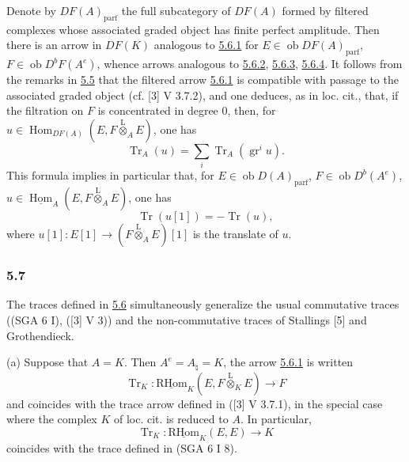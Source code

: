 \documentclass[11pt]{article}
\providecommand{\uHom}{\underline{\Hom}}
\providecommand{\uRHom}{\underline{\RHom}}
\DeclareMathOperator{\Hom}{Hom}
\newcommand{\ob}{\operatorname{ob}}
\providecommand{\RHom}{\mathrm{RHom}}
\providecommand{\Tr}{\operatorname{Tr}}
\providecommand{\Tr}{\operatorname{Tr}}
\providecommand{\lten}{\overset{\mathrm L}{\otimes}}
\providecommand{\Tr}{\operatorname{Tr}}
\providecommand{\RHom}{\mathrm{RHom}}
\providecommand{\Hom}{\operatorname{Hom}}
\providecommand{\ob}{\operatorname{ob}}
\providecommand{\lten}{\overset{\mathrm L}{\otimes}}
\providecommand{\RHom}{\mathrm R\mathcal{H}om}
\providecommand{\lten}{\overset{\mathrm L}{\otimes}}
\providecommand{\Tr}{\operatorname{Tr}}
\providecommand{\lten}{\overset{\mathrm L}{\otimes}}
\providecommand{\lten}{\overset{\mathrm L}{\otimes}}
\providecommand{\lten}{\overset{\mathrm L}{\otimes}}
\providecommand{\RHom}{\mathrm{RHom}}
\providecommand{\Hom}{\operatorname{Hom}}
\providecommand{\Tr}{\operatorname{Tr}}
\providecommand{\lten}{\overset{\mathrm L}{\otimes}}
\begin{document}
Denote by $DF(A)_{\mathrm{parf}}$ the full subcategory of $DF(A)$ formed by filtered complexes whose associated graded object has finite perfect amplitude. Then there is an arrow in $DF(K)$ analogous to \hyperref[sga5:IIIB:equation:5.6.1]{5.6.1} for $E\in\ob DF(A)_{\mathrm{parf}}$, $F\in\ob D^bF(A^e)$, whence arrows analogous to \hyperref[sga5:IIIB:equation:5.6.2]{5.6.2}, \hyperref[sga5:IIIB:equation:5.6.3]{5.6.3}, \hyperref[sga5:IIIB:equation:5.6.4]{5.6.4}. It follows from the remarks in \hyperref[sga5:IIIB:subsubsection:5.5]{5.5} that the filtered arrow \hyperref[sga5:IIIB:equation:5.6.1]{5.6.1} is compatible with passage to the associated graded object (cf. [3] V 3.7.2), and one deduces, as in loc. cit., that, if the filtration on $F$ is concentrated in degree $0$, then, for $u\in\Hom_{DF(A)}(E,F\lten_AE)$, one has
\begin{equation}\tag{5.6.5}\label{sga5:IIIB:equation:5.6.5}
\Tr_A(u)=\sum_i\Tr_A(\operatorname{gr}^i u).
\end{equation}
This formula implies in particular that, for $E\in\ob D(A)_{\mathrm{parf}}$, $F\in\ob D^b(A^e)$, $u\in\uHom_A(E,F\lten_AE)$, one has
\begin{equation}\tag{5.6.6}\label{sga5:IIIB:equation:5.6.6}
\Tr(u[1])=-\Tr(u),
\end{equation}
where $u[1]:E[1]\to(F\lten_AE)[1]$ is the translate of $u$.

\subsubsection*{5.7}\label{sga5:IIIB:subsubsection:5.7}

The traces defined in \hyperref[sga5:IIIB:subsubsection:5.6]{5.6} simultaneously generalize the usual commutative traces ((SGA 6 I), ([3] V 3)) and the non-commutative traces of Stallings [5] and Grothendieck.

(a) Suppose that $A=K$. Then $A^e=A_\natural=K$, the arrow \hyperref[sga5:IIIB:equation:5.6.1]{5.6.1} is written
\[
\Tr_K:\uRHom_K(E,F\lten_KE)\longrightarrow F
\]
and coincides with the trace arrow defined in ([3] V 3.7.1), in the special case where the complex $K$ of loc. cit. is reduced to $A$. In particular,
\[
\Tr_K:\uRHom_K(E,E)\longrightarrow K
\]
coincides with the trace defined in (SGA 6 I 8).
\end{document}
